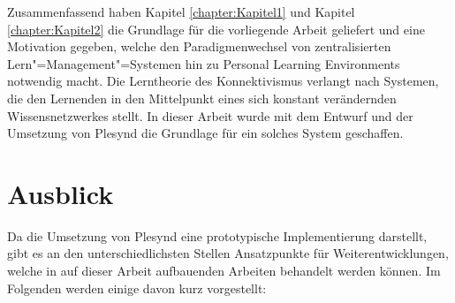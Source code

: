 Zusammenfassend haben Kapitel \ref{chapter:Kapitel1} und Kapitel \ref{chapter:Kapitel2} die Grundlage für die vorliegende Arbeit geliefert und eine Motivation gegeben, welche den Paradigmenwechsel von zentralisierten Lern"=Management"=Systemen hin zu Personal Learning Environments notwendig macht. Die Lerntheorie des Konnektivismus verlangt nach Systemen, die den Lernenden in den Mittelpunkt eines sich konstant verändernden Wissensnetzwerkes stellt. In dieser Arbeit wurde mit dem Entwurf und der Umsetzung von Plesynd die Grundlage für ein solches System geschaffen.

\section{Ausblick}
Da die Umsetzung von Plesynd eine prototypische Implementierung darstellt, gibt es an den unterschiedlichsten Stellen Ansatzpunkte für Weiterentwicklungen, welche in auf dieser Arbeit aufbauenden Arbeiten behandelt werden können. Im Folgenden werden einige davon kurz vorgestellt:

